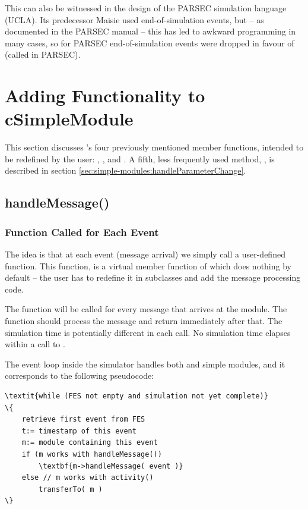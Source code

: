 This can also be witnessed in the design of the PARSEC
simulation language (UCLA). Its predecessor Maisie used
end-of-simulation events, but -- as documented in the PARSEC manual --
this has led to awkward programming in many cases, so for PARSEC
end-of-simulation events were dropped in favour of 
(called  in PARSEC).


\section{Adding Functionality to cSimpleModule}
\label{sec:simple-modules:adding-functionality-to-csimplemodule}

This section discusses 's four previously
mentioned member functions, intended to be redefined by the user:
, , 
and . A fifth, less frequently used method,
, is described in section
\ref{sec:simple-modules:handleParameterChange}.


\subsection{handleMessage()}
\label{sec:simple-modules:handlemessage}

\subsubsection{Function Called for Each Event}


The idea is that at each event (message arrival) we
simply call a user-defined function. This function,
 is a
virtual member function of  which does
nothing by default -- the user has to redefine it in subclasses
and add the message processing code.

The  function will be called for every message
that arrives at the module. The function should process the message
and return immediately after that. The simulation time is potentially
different in each call. No simulation time elapses within a call
to .

The event loop inside the simulator handles both 
and  simple modules, and it corresponds
to the following pseudocode:

\begin{Verbatim}[commandchars=\\\{\}]
\textit{while (FES not empty and simulation not yet complete)}
\{
    retrieve first event from FES
    t:= timestamp of this event
    m:= module containing this event
    if (m works with handleMessage())
        \textbf{m->handleMessage( event )}
    else // m works with activity()
        transferTo( m )
\}
\end{Verbatim}

